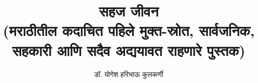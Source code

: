 
\usepackage{fontspec}
\usepackage{tikz}
\usepackage{everypage}

\setmainfont[Script=Devanagari] {Tiro Devanagari Marathi}
\newfontfamily{}
\newfontfamily{}
\graphicspath{{images/}}


\date{} %


\title{
    {\Huge \textbf{सहज जीवन}} \\ 
    \vspace{0.5em}
    {\large (मराठीतील कदाचित पहिले मुक्त-स्रोत, सार्वजनिक, सहकारी आणि सदैव अद्ययावत राहणारे पुस्तक)}
}
\author{\textsc{डॉ. योगेश हरिभाऊ कुलकर्णी}}


\frontmatter
\maketitle


\tableofcontents

\mainmatter



